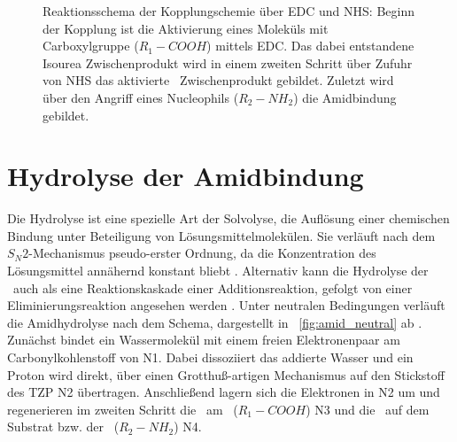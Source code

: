 \begin{figure}[H]
	\begin{flushleft}
	\end{flushleft}
	\caption[Reaktionsschema der Kopplungschemie über \acs*{EDC} und \acs*{NHS}]{Reaktionsschema der Kopplungschemie über \acs*{EDC} und \acs*{NHS}: Beginn der Kopplung ist die Aktivierung eines Moleküls mit Carboxylgruppe ($R_1-COOH$) mittels \acs*{EDC}. Das dabei entstandene Isourea Zwischenprodukt wird in einem zweiten Schritt über Zufuhr von \acs*{NHS} das aktivierte \ester~Zwischenprodukt gebildet. Zuletzt wird über den Angriff eines Nucleophils ($R_2-NH_2$) die Amidbindung gebildet.}
	\label{fig:Kopplungschemie}
\end{figure}

\section{Hydrolyse der Amidbindung}
\label{sec:hydrolyse_der_amidbindung}

Die Hydrolyse ist eine spezielle Art der Solvolyse, die Auflösung einer chemischen Bindung unter Beteiligung von Lösungsmittelmolekülen. Sie verläuft nach dem $S_N2$-Mechanismus pseudo-erster Ordnung, da die Konzentration des Lösungsmittel annähernd konstant bliebt \cite[91]{Hadener.2006}. Alternativ kann die Hydrolyse der \amid~auch als eine Reaktionskaskade einer Additionsreaktion, gefolgt von einer Eliminierungsreaktion angesehen werden \cite[288]{Latscha.2016}. Unter neutralen Bedingungen verläuft die Amidhydrolyse nach dem Schema, dargestellt in \abb~\ref{fig:amid_neutral} ab \cites[288]{Latscha.2016}{Zahn.2004b}.\\

Zunächst bindet ein Wassermolekül mit einem freien Elektronenpaar am Carbonylkohlenstoff von N1. Dabei dissoziiert das addierte Wasser und ein Proton wird direkt, über einen Grotthuß-artigen Mechanismus auf den Stickstoff des \ac{TZP} N2 übertragen. Anschließend lagern sich die Elektronen in N2 um und regenerieren im zweiten Schritt die \carboxys~am \spacer~($R_1-COOH$) N3 und die \amino~auf dem Substrat bzw. der \spitze~($R_2-NH_2$) N4.

